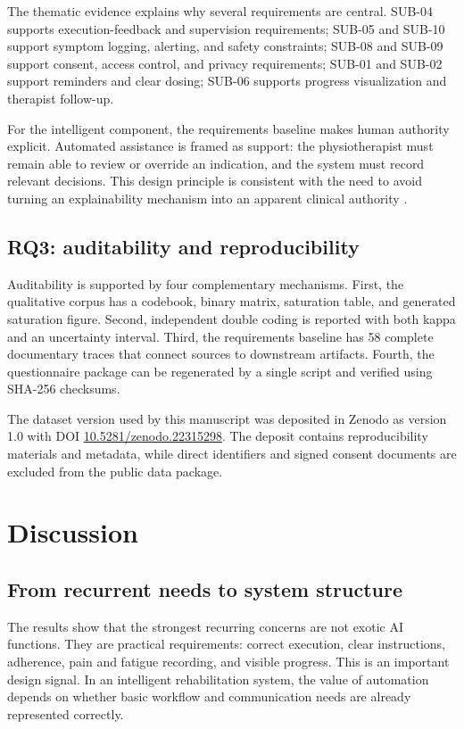 \documentclass[pdflatex,sn-basic]{sn-jnl}
\begin{document}
The thematic evidence explains why several requirements are central. SUB-04 supports execution-feedback and supervision requirements; SUB-05 and SUB-10 support symptom logging, alerting, and safety constraints; SUB-08 and SUB-09 support consent, access control, and privacy requirements; SUB-01 and SUB-02 support reminders and clear dosing; SUB-06 supports progress visualization and therapist follow-up.

For the intelligent component, the requirements baseline makes human authority explicit. Automated assistance is framed as support: the physiotherapist must remain able to review or override an indication, and the system must record relevant decisions. This design principle is consistent with the need to avoid turning an explainability mechanism into an apparent clinical authority \citep{chazette2020explainability,holzinger2017xai}.

\subsection{RQ3: auditability and reproducibility}
Auditability is supported by four complementary mechanisms. First, the qualitative corpus has a codebook, binary matrix, saturation table, and generated saturation figure. Second, independent double coding is reported with both kappa and an uncertainty interval. Third, the requirements baseline has 58 complete documentary traces that connect sources to downstream artifacts. Fourth, the questionnaire package can be regenerated by a single script and verified using SHA-256 checksums.

The dataset version used by this manuscript was deposited in Zenodo as version 1.0 with DOI \href{https://doi.org/10.5281/zenodo.22315298}{10.5281/zenodo.22315298}. The deposit contains reproducibility materials and metadata, while direct identifiers and signed consent documents are excluded from the public data package.

\section{Discussion}
\subsection{From recurrent needs to system structure}
The results show that the strongest recurring concerns are not exotic AI functions. They are practical requirements: correct execution, clear instructions, adherence, pain and fatigue recording, and visible progress. This is an important design signal. In an intelligent rehabilitation system, the value of automation depends on whether basic workflow and communication needs are already represented correctly.
\end{document}
